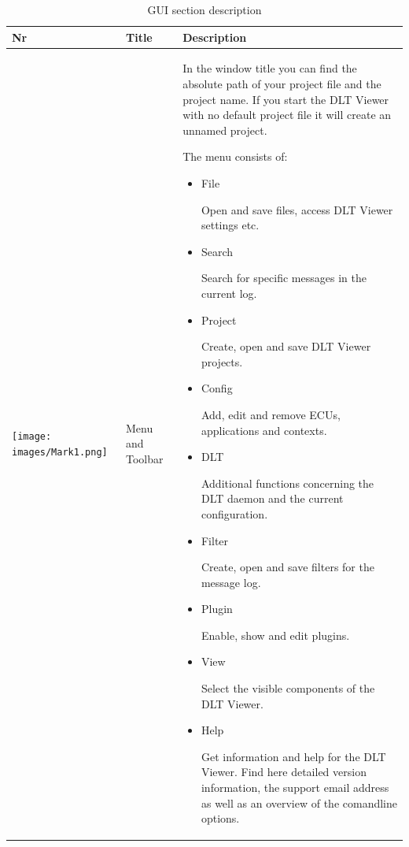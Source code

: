 \documentclass[a4paper,11pt]{article}
\begin{document}
\pagebreak

\begin{longtable}{| l | m{3cm}  | m{11cm} |}
\caption[GUI section description]{GUI section description} \label{guisectiondescription} \\
 \hline
   \textbf{Nr} & \textbf{Title} & \textbf{Description} \\
\hline
   \texttt{[image: images/Mark1.png]}
   &
    Menu and Toolbar
   &
   In the window title you can find the absolute path of your project file 
   and the project name. If you start the DLT Viewer
   with no default project file it will
   create an unnamed project.

   The menu consists of:

\begin{itemize}
    \item \begin{bf}File\end{bf}
     Open and save files, access DLT Viewer settings etc.
    \item \begin{bf}Search\end{bf}
     Search for specific messages in the current log.
    \item \begin{bf}Project\end{bf}
      Create, open and save DLT Viewer projects.
    \item \begin{bf}Config\end{bf}
     Add, edit and remove ECUs, applications and contexts.
    \item \begin{bf}DLT\end{bf}
      Additional functions concerning the DLT daemon and the current configuration.
    \item \begin{bf}Filter\end{bf}
       Create, open and save filters for the message log.
    \item \begin{bf}Plugin\end{bf}
     Enable, show and edit plugins.
    \item \begin{bf}View\end{bf}
     Select the visible components of the DLT Viewer.
    \item \begin{bf}Help\end{bf}
    Get information and help for the DLT Viewer. Find here detailed version information, the support email address as well as
    an overview of the comandline options.
 \end{itemize}


\end{longtable}
\end{document}

